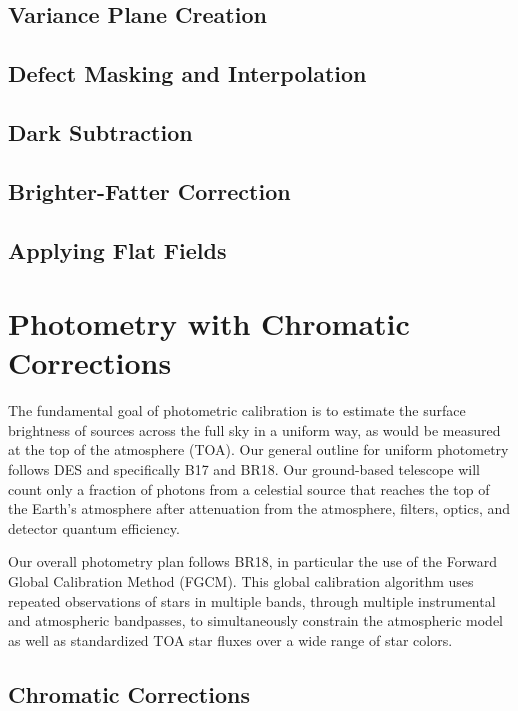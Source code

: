 \documentclass[SE,authoryear,lsstdraft,toc]{lsstdoc}
\begin{document}
\subsection{Variance Plane Creation}

\subsection{Defect Masking and Interpolation}

\subsection{Dark Subtraction}

\subsection{Brighter-Fatter Correction}

\subsection{Applying Flat Fields}

\section{Photometry with Chromatic Corrections}
\label{sec:photocal}

The fundamental goal of photometric calibration is to estimate the surface
brightness of sources across the full sky in a uniform way, as would be
measured at the top of the atmosphere (TOA).  Our general outline for uniform
photometry follows DES and specifically B17 and BR18.  Our ground-based
telescope will count only a fraction of photons from a celestial source that
reaches the top of the Earth's atmosphere after attenuation from the
atmosphere, filters, optics, and detector quantum efficiency.

Our overall photometry plan follows BR18, in particular the use of the Forward
Global Calibration Method (FGCM).  This global calibration algorithm uses
repeated observations of stars in multiple bands, through multiple instrumental
and atmospheric bandpasses, to simultaneously constrain the atmospheric model
as well as standardized TOA star fluxes over a wide range of star colors.

\subsection{Chromatic Corrections}
\end{document}
